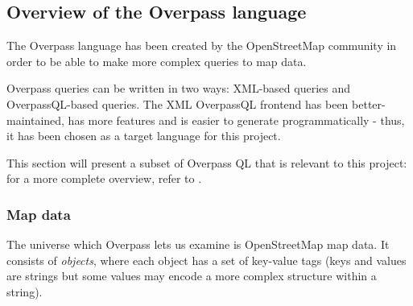 \documentclass[main.tex]{subfiles}
\begin{document}
\subsection{Overview of the Overpass language}
The Overpass language \cite{overpass} has been created by the OpenStreetMap
community in order to be able to make more complex queries to map data.

Overpass queries can be written in two ways: XML-based queries and OverpassQL-based
queries. The XML OverpassQL frontend has been better-maintained, has more features
and is easier to generate programmatically - thus, it has been chosen as a target
language for this project.

This section will present a subset of Overpass QL that is relevant to this project: for a
more complete overview, refer to \cite{overpassql}.

\subsubsection{Map data}
The universe which Overpass lets us examine is OpenStreetMap map data.
It consists of \emph{objects}, where each object has a set of key-value
tags (keys and values are strings but some values may encode a more complex
structure within a string).
\end{document}
